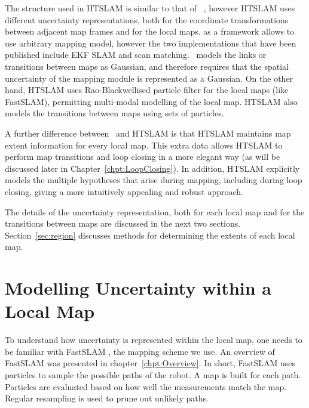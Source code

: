 The structure used in HTSLAM is similar to that of \Atlas\ 
\cite{bosse02atlas}, however HTSLAM uses different uncertainty
representations, both for the coordinate transformations between
adjacent map frames and for the local maps. 
\Atlas as a framework allows to use arbitrary mapping model, however the two
implementations that have been published include EKF SLAM and scan matching.
\Atlas\ models the links or transitions between maps as Gaussian, and therefore
requires that the spatial uncertainty of the mapping module is represented as a Gaussian.
On the other hand, HTSLAM uses Rao-Blackwellised particle filter for the local maps (like FastSLAM), 
permitting multi-modal modelling of the local map. HTSLAM also models the transitions 
between maps using sets of particles.

A further difference between \Atlas\ and HTSLAM is that HTSLAM
maintains map extent information for every local map. This extra data
allows HTSLAM to perform map transitions and loop closing in a more
elegant way (as will be discussed later in
Chapter~\ref{chpt:LoopClosing}). In addition, HTSLAM explicitly
models the multiple hypotheses that arise during mapping, including
during loop closing, giving a more intuitively appealing and robust
approach.

The details of the uncertainty representation, both for each local map
and for the transitions between maps are discussed in the next two
sections.  Section~\ref{sec:region} discusses methods for
determining the extents of each local map.

\section{Modelling Uncertainty within a Local Map}
\label{sec:local_map}

To understand how uncertainty is represented within the local map, one
needs to be familiar with FastSLAM \cite{Montemerlo02d}, the mapping
scheme we use. An overview of FastSLAM was presented in
chapter~\ref{chpt:Overview}. In short, FastSLAM uses particles to
sample the possible paths of the robot. A map is built for each
path. Particles are evaluated based on how well the measurements match
the map.  Regular resampling is used to prune out unlikely paths.

